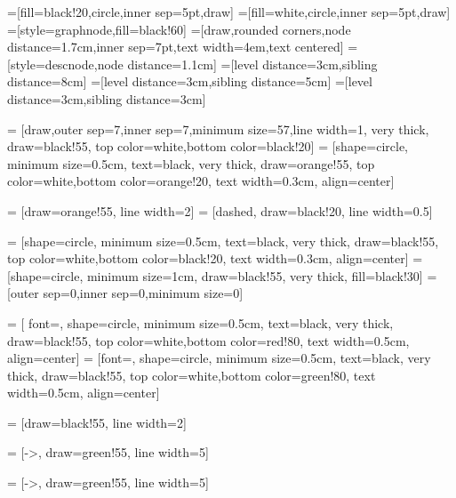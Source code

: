 \documentclass[10pt
,a4paper,
parskip]
{scrbook}
\begin{document}
=[fill=black!20,circle,inner sep=5pt,draw]
=[fill=white,circle,inner sep=5pt,draw]
=[style=graphnode,fill=black!60]
=[draw,rounded corners,node distance=1.7cm,inner sep=7pt,text width=4em,text centered]
=[style=descnode,node distance=1.1cm]
=[level distance=3cm,sibling distance=8cm]
=[level distance=3cm,sibling distance=5cm]
=[level distance=3cm,sibling distance=3cm]
  

 = [draw,outer sep=7,inner sep=7,minimum size=57,line width=1, very thick, draw=black!55, top color=white,bottom color=black!20]
 = [shape=circle, minimum size=0.5cm,  text=black, very thick, draw=orange!55, top color=white,bottom color=orange!20, text width=0.3cm, align=center]


 = [draw=orange!55, line width=2]
 = [dashed, draw=black!20, line width=0.5]



 = [shape=circle, minimum size=0.5cm, text=black, very thick, draw=black!55, top color=white,bottom color=black!20, text width=0.3cm, align=center]
 = [shape=circle, minimum size=1cm, draw=black!55, very thick, fill=black!30]
 = [outer sep=0,inner sep=0,minimum size=0]

 = [  font={\huge\bfseries}, shape=circle, minimum size=0.5cm, text=black, very thick, draw=black!55, top color=white,bottom color=red!80, text width=0.5cm, align=center]
 = [font={\huge\bfseries}, shape=circle, minimum size=0.5cm, text=black, very thick, draw=black!55, top color=white,bottom color=green!80, text width=0.5cm, align=center]

 = [draw=black!55, line width=2]

 = [->, draw=green!55, line width=5]

 = [->, draw=green!55, line width=5]

 
    
   
\end{document}
